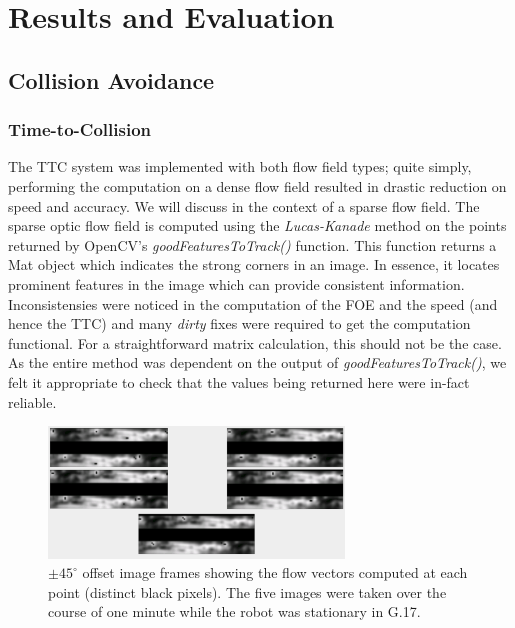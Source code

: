 \documentclass[a4paper,11pt,twoside,openright]{article}
\let\oldsection\section
\def\section{\cleardoublepage\oldsection}
\begin{document}
\newpage

\section{ Results and Evaluation } \label{sec:results}
\subsection{Collision Avoidance}
\subsubsection{Time-to-Collision}
The TTC system was implemented with both flow field types; quite simply, performing the computation on a dense flow
field resulted in drastic reduction on speed and accuracy. We will discuss in the context of a sparse flow field. The
sparse optic flow field is computed using the \textit{Lucas-Kanade} method on the points returned by OpenCV's
\textit{goodFeaturesToTrack()} function. This function returns a Mat object which indicates the strong corners in an image.
In essence, it locates prominent features in the image which can provide consistent information. Inconsistensies
were noticed in the computation of the FOE and the speed (and hence the TTC) and many \textit{dirty} fixes were required to get the computation
functional. For a straightforward matrix calculation, this should not be the case. As the entire method was dependent on
the output of \textit{goodFeaturesToTrack()}, we felt it appropriate to check that the values being returned here were in-fact
reliable.

\begin{figure}
  \centering
  \includegraphics[width=0.7\textwidth]{OpticalFlowInconsistencies}
  \caption{
    \label{fig:ofbad} $\pm 45^{\circ}$ offset image frames showing the flow vectors computed at each point (distinct black
    pixels). The five images were taken over the course of one minute while the robot was stationary in G.17.
  }
\end{figure}
\end{document}
